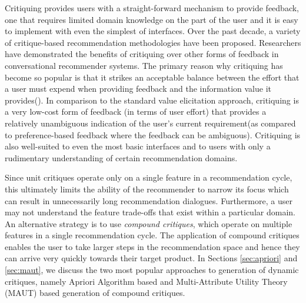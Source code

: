Critiquing  provides users with a straight-forward mechanism to provide feedback, one that requires limited domain knowledge on the part of the user and it is easy to implement with even the simplest of interfaces.
Over the past decade, a variety of critique-based recommendation methodologies have been proposed.
Researchers have demonstrated the benefits of critiquing over other forms of feedback in conversational recommender systems.
The primary reason why critiquing has become so popular is that it strikes an acceptable balance between the effort that a user must expend when providing feedback and the information value it provides(\cite{mcginty11}).
In comparison to the standard value elicitation approach, critiquing is a very low-cost form of feedback (in terms of user effort) that provides a relatively unambiguous indication of the user's current requirement(as compared to preference-based feedback where the feedback can be ambiguous).
 Critiquing is also well-suited to even the most basic interfaces and to users with only a rudimentary understanding of certain recommendation domains.



Since unit critiques operate only on a single feature in a recommendation cycle, this ultimately limits the ability of the recommender to narrow its focus which can result in unnecessarily long recommendation dialogues.
Furthermore, a user may not understand the feature trade-offs that exist within a particular domain.
An alternative strategy is to use \textit{compound critiques}, which operate on multiple features in a single recommendation cycle.
The application of compound critiques enables the user to take larger steps in the recommendation space and hence they can arrive very quickly towards their target product.
In Sections \ref{sec:apriori} and \ref{sec:maut}, we discuss the two most popular approaches to generation of dynamic critiques, namely Apriori Algorithm based  and Multi-Attribute Utility Theory (MAUT) based generation of compound critiques.




